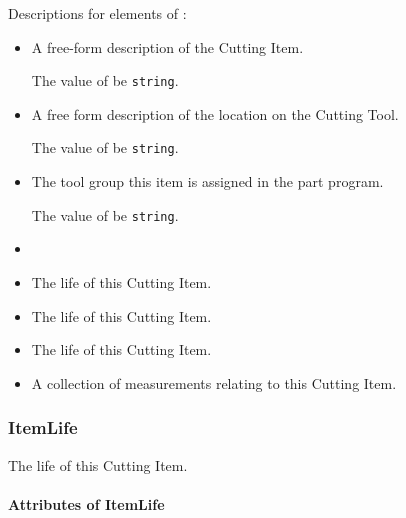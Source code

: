 Descriptions for elements of :

\begin{itemize}

\item {} \newline A free-form description of the Cutting Item.

The value of  \MUST be \texttt{string}.

\item {} \newline A free form description of the location on the Cutting Tool.

The value of  \MUST be \texttt{string}.

\item {} \newline The tool group this item is assigned in the part program.

The value of  \MUST be \texttt{string}.

\item {} \newline 

\item {} \newline The life of this Cutting Item.

\item {} \newline The life of this Cutting Item.

\item {} \newline The life of this Cutting Item.

\item {} \newline A collection of measurements relating to this Cutting Item.
\end{itemize}

\subsubsection{ItemLife}
\label{sec:ItemLife}



The life of this Cutting Item.


\paragraph{Attributes of ItemLife}\mbox{}
\label{sec:Attributes of ItemLife}

